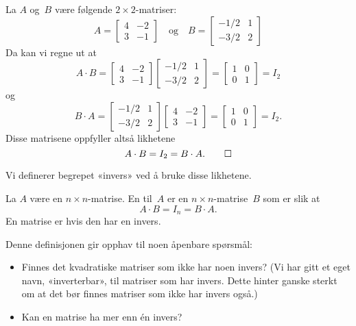 \begin{ex}
\label{ex:invers}
La $A$ og~$B$ være følgende $2 \times 2$-matriser:
\[
A =
\begin{bmatrix}
 4 & -2 \\
 3 & -1
\end{bmatrix}
\quad\text{og}\quad
B =
\begin{bmatrix}
-1/2 & 1 \\
-3/2 & 2
\end{bmatrix}
\]
Da kan vi regne ut at
\[
A \cdot B
= 
\begin{bmatrix}
 4 & -2 \\
 3 & -1
\end{bmatrix}
\begin{bmatrix}
-1/2 & 1 \\
-3/2 & 2
\end{bmatrix}
=
\begin{bmatrix}
1 & 0 \\
0 & 1
\end{bmatrix}
= I_2
\]
og
\[
B \cdot A
= 
\begin{bmatrix}
-1/2 & 1 \\
-3/2 & 2
\end{bmatrix}
\begin{bmatrix}
 4 & -2 \\
 3 & -1
\end{bmatrix}
=
\begin{bmatrix}
1 & 0 \\
0 & 1
\end{bmatrix}
= I_2.
\]
Disse matrisene oppfyller altså likhetene
\[
A \cdot B = I_2 = B \cdot A.\qedhere
\]
\end{ex}

Vi definerer begrepet «invers» ved å bruke disse likhetene.

\begin{defn}
La $A$ være en $n \times n$-matrise.  En  til~$A$ er
en $n \times n$-matrise~$B$ som er slik at
\[
A \cdot B = I_n = B \cdot A.
\]
En matrise er  hvis den har en invers.
\end{defn}

Denne definisjonen gir opphav til noen åpenbare spørsmål:
\begin{itemize}
\item Finnes det kvadratiske matriser som ikke har noen invers?  (Vi
har gitt et eget navn, «inverterbar», til matriser som har invers.
Dette hinter ganske sterkt om at det bør finnes matriser som ikke har
invers også.)
\item Kan en matrise ha mer enn én invers?
\end{itemize}

